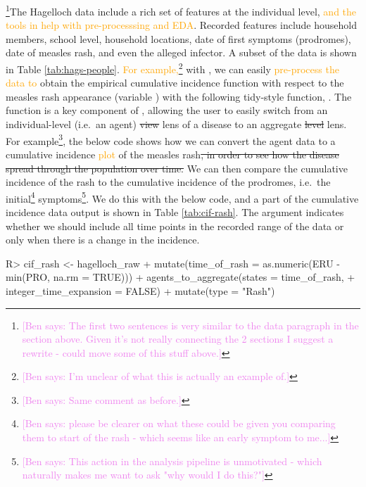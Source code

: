 \documentclass[
  shortnames]{jss}
\begin{document}
\footnote{\textcolor{violet}{[Ben says: The first two sentences is very similar to the data paragraph in the section above. Given it's not really connecting the 2 sections I suggest a rewrite - could move some of this stuff above.]}}The
Hagelloch data include a rich set of features at the individual level,
\textcolor{orange}{and the tools in  help with pre-processsing and EDA}.
Recorded features include household members, school level, household
locations, date of first symptoms (prodromes), date of measles rash, and
even the alleged infector. A subset of the data is shown in Table
\ref{tab:hags-people}.
\textcolor{orange}{For example,}\footnote{\textcolor{violet}{[Ben says: I'm unclear of what this is actually an example of.]}}
with , we can easily
\textcolor{orange}{pre-process the data to} obtain the empirical
cumulative incidence function with respect to the measles rash
appearance (variable ) with the following tidy-style function,
. The function 
is a key component of , allowing the user to easily
switch from an individual-level (i.e.~an agent) \sout{view} lens of a
disease to an aggregate \sout{level} lens. For
example\footnote{\textcolor{violet}{[Ben says: Same comment as before.]}},
the below code shows how we can convert the agent data to a cumulative
incidence \textcolor{orange}{plot} of the measles
rash\sout{, in order to see how the disease spread through the population over time.}
We can then compare the cumulative incidence of the rash to the
cumulative incidence of the prodromes, i.e.~the
initial\footnote{\textcolor{violet}{[Ben says: please be clearer on what these could be given you comparing them to start of the rash - which seems like an early symptom to me...]}}
symptoms\footnote{\textcolor{violet}{[Ben says: This action in the analysis pipeline is unmotivated - which naturally makes me want to ask "why would I do this?"]}}.
We do this with the below code, and a part of the cumulative incidence
data output is shown in Table \ref{tab:cif-rash}. The argument
 indicates whether we should include all
time points in the recorded range of the data or only when there is a
change in the incidence.

\begin{CodeChunk}
\begin{CodeInput}
R> cif_rash  <- hagelloch_raw %
+   mutate(time_of_rash = as.numeric(ERU - min(PRO, na.rm = TRUE))) %
+   agents_to_aggregate(states = time_of_rash,
+                       integer_time_expansion = FALSE) %
+   mutate(type = "Rash")
\end{CodeInput}
\end{CodeChunk}
\end{document}
